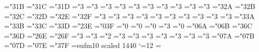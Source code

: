 \mathchardef\gnapprox="3\msb@1B \mathchardef\nsim="3\msb@1C
\mathchardef\ncong="3\msb@1D
\def\napprox{\not\approx}
\mathchardef\varsubsetneq="3
\mathchardef\varsupsetneq="3
\mathchardef\nsubseteqq="3
\mathchardef\nsupseteqq="3
\mathchardef\subsetneqq="3
\mathchardef\supsetneqq="3
\mathchardef\varsubsetneqq="3
\mathchardef\varsupsetneqq="3
\mathchardef\subsetneq="3 \mathchardef\supsetneq="3
\mathchardef\nsubseteq="3\msb@2A \mathchardef\nsupseteq="3\msb@2B
\mathchardef\nparallel="3\msb@2C \mathchardef\nmid="3\msb@2D
\mathchardef\nshortmid="3\msb@2E
\mathchardef\nshortparallel="3\msb@2F
\mathchardef\nvdash="3 \mathchardef\nVdash="3
\mathchardef\nvDash="3 \mathchardef\nVDash="3
\mathchardef\ntrianglerighteq="3
\mathchardef\ntrianglelefteq="3
\mathchardef\ntriangleleft="3
\mathchardef\ntriangleright="3
\mathchardef\nleftarrow="3
\mathchardef\nrightarrow="3
\mathchardef\nLeftarrow="3\msb@3A
\mathchardef\nRightarrow="3\msb@3B
\mathchardef\nLeftrightarrow="3\msb@3C
\mathchardef\nleftrightarrow="3\msb@3D
\mathchardef\divideontimes="2\msb@3E
\mathchardef\varnothing="0\msb@3F \mathchardef\nexists="0
\mathchardef\mho="0 \mathchardef\eth="0
\mathchardef\eqsim="3 \mathchardef\beth="0
\mathchardef\gimel="0\msb@6A \mathchardef\daleth="0\msb@6B
\mathchardef\lessdot="3\msb@6C \mathchardef\gtrdot="3\msb@6D
\mathchardef\ltimes="2\msb@6E \mathchardef\rtimes="2\msb@6F
\mathchardef\shortmid="3
\mathchardef\shortparallel="3
\mathchardef\smallsetminus="2
\mathchardef\thicksim="3 \mathchardef\thickapprox="3
\mathchardef\approxeq="3 \mathchardef\succapprox="3
\mathchardef\precapprox="3
\mathchardef\curvearrowleft="3
\mathchardef\curvearrowright="3
\mathchardef\digamma="0\msb@7A \mathchardef\varkappa="0\msb@7B
\mathchardef\hslash="0\msb@7D \mathchardef\hbar="0\msb@7E
\mathchardef\backepsilon="3\msb@7F
\def\Bbb{\ifmmode\let\next\Bbb@\else
 \def\next{\errmessage{Use \string\Bbb\space only in math mode}}\fi\next}
\def\Bbb@#1{{\Bbb@@{#1}}}
\def\Bbb@@#1{\fam\msbfam#1}
\font\sacfont=eufm10 scaled 1440 \catcode`\@=12
\def\sla#1{\mkern-1.5mu\raise0.4pt\hbox{$\not$}\mkern1.2mu #1\mkern 0.7mu}
\def\Dbar{\mkern-1.5mu\raise0.4pt\hbox{$\not$}\mkern-.1mu {\rm D}\mkern.1mu}
\def\Abar{\mkern1.mu\raise0.4pt\hbox{$\not$}\mkern-1.3mu A\mkern.1mu}
\nopagenumbers
\footline={\ifnum{}\hfill\else\draftdate\hfil{\headrm\folio}%
\hfil\hphantom{\draftdate}\fi} \else{} \hoffset=8mm \voffset=16mm
\def\hskipb#1#2{\hskip#1#2}
\def\sla#1{\mkern-1.5mu\raise0.5pt\hbox{$\not$}\mkern1.2mu #1\mkern 0.7mu}
\def\Dbar{\mkern-1.5mu\raise0.5pt\hbox{$\not$}\mkern-.1mu {\rm D}\mkern.1mu}
\def\Abar{\mkern1.mu\raise0.5pt\hbox{$\not$}\mkern-1.3mu A\mkern.1mu}
\fi

